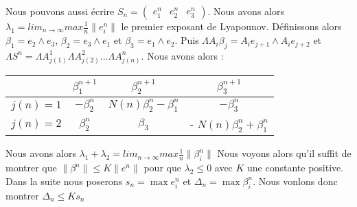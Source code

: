 \documentclass[12pt]{article}
\theoremstyle{plain}%
\theoremstyle{definition}
\theoremstyle{remark}
\begin{document}
Nous pouvons aussi écrire $S_n=\begin{pmatrix} e_1^n & e_2^n & e_3^n\end{pmatrix}$.
 Nous avons alors $\lambda_1= lim_{n\to \infty} max \frac{1}{n}\|e_i^n\|$ le premier exposant de Lyapounov.\newline
 Définissons alors $\beta_1=e_2 \land e_3$, $\beta_2=e_3 \land e_1$ et $\beta_3=e_1 \land e_2$.
 Puis $\Lambda A_i \beta_j=A_i e_{j+1} \land A_i e_{j+2}$ et $\Lambda S^n=\Lambda A_{j(1)}^1  \Lambda A_{j(2)}^2 ... \Lambda A_{j(n)}^n$. \newline
 Nous avons alors :
  \begin{tabular}{c|c|c|c|}
    & $\beta_1^{n+1}$ & $\beta_2^{n+1}$ & $\beta_3^{n+1}$\\
  \hline
  $j(n)=1$ & $-\beta_2^{n}$ & $N(n) \beta_2^n-\beta_1^n$ & $-\beta_3^n$ \\
  $j(n)=2$ & $\beta_2^{n}$ & $\beta_3$ & - $N(n) \beta_2^n+\beta_1^n$ \\
  \end{tabular}
  Nous avons alors $\lambda_1 + \lambda_2= lim_{n\to \infty} max \frac{1}{n}\|\beta_i^n\|$ \newline
  Nous voyons alors qu'il suffit de montrer que $\|\beta^n\| \leq K \|e^n\|$ pour que $\lambda_2 \leq 0$ avec $K$ une constante positive. \newline
  Dans la suite nous poserons $s_n= \max e_i^n$ et $\Delta_n=\max \beta_i^n$. Nous vonlons donc montrer $\Delta_n \leq K s_n$
\end{document}
